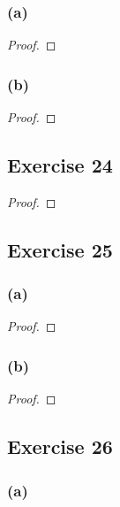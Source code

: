 \documentclass[14pt]{extarticle}
\begin{document}
\subsubsection{(a)}

\begin{proof}

\end{proof}

\subsubsection{(b)}

\begin{proof}

\end{proof}

\subsection{Exercise 24}

\begin{proof}

\end{proof}

\subsection{Exercise 25}

\subsubsection{(a)}

\begin{proof}

\end{proof}

\subsubsection{(b)}

\begin{proof}

\end{proof}

\subsection{Exercise 26}

\subsubsection{(a)}
\end{document}
